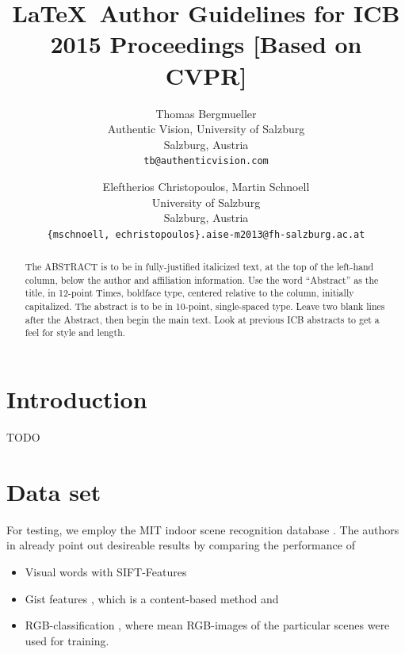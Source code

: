 \documentclass[10pt,twocolumn,letterpaper]{article}
\begin{document}
\title{\LaTeX\ Author Guidelines for ICB 2015 Proceedings [Based on CVPR]}

\author{Thomas Bergmueller\\
Authentic Vision, University of Salzburg\\
Salzburg, Austria\\
{\tt\small tb@authenticvision.com}
\and
Eleftherios Christopoulos, Martin Schnoell\\
University of Salzburg\\
Salzburg, Austria\\
{\tt\small \{mschnoell, echristopoulos\}.aise-m2013@fh-salzburg.ac.at}
}

\maketitle
\thispagestyle{empty}

\begin{abstract}
   The ABSTRACT is to be in fully-justified italicized text, at the top
   of the left-hand column, below the author and affiliation
   information. Use the word ``Abstract'' as the title, in 12-point
   Times, boldface type, centered relative to the column, initially
   capitalized. The abstract is to be in 10-point, single-spaced type.
   Leave two blank lines after the Abstract, then begin the main text.
   Look at previous ICB abstracts to get a feel for style and length.
\end{abstract}

\section{Introduction}
TODO

\section{Data set}
\label{sec:data}
For testing, we employ the MIT indoor scene recognition database \cite{indoorScenes}. The authors in \cite{indoorScenes} already point out desireable results by comparing the performance of 
\begin{itemize}
	\item Visual words with SIFT-Features
	\item Gist features \cite{oliva06}, which is a content-based method and
	\item RGB-classification \cite{indoorScenes}, where mean RGB-images of the particular scenes were used for training.
\end{itemize}
\end{document}
